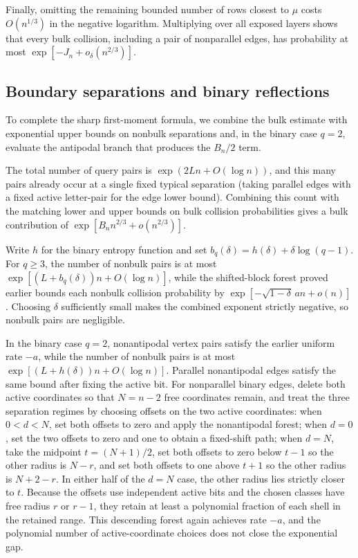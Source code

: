 Finally, omitting the remaining bounded number of rows closest to $\mu$ costs $O(n^{1/3})$ in the negative logarithm. Multiplying over all exposed layers shows that every bulk collision, including a pair of nonparallel edges, has probability at most $\exp[-J_n+o_\delta(n^{2/3})]$.

\subsection{Boundary separations and binary reflections}
To complete the sharp first-moment formula, we combine the bulk estimate with exponential upper bounds on nonbulk separations and, in the binary case $q=2$, evaluate the antipodal branch that produces the $B_n/2$ term.

The total number of query pairs is $\exp(2Ln+O(\log n))$, and this many pairs already occur at a single fixed typical separation (taking parallel edges with a fixed active letter-pair for the edge lower bound). Combining this count with the matching lower and upper bounds on bulk collision probabilities gives a bulk contribution of $\exp[B_n n^{2/3}+o(n^{2/3})]$.

Write $h$ for the binary entropy function and set $b_q(\delta)=h(\delta)+\delta\log(q-1)$. For $q\ge3$, the number of nonbulk pairs is at most $\exp[(L+b_q(\delta))n+O(\log n)]$, while the shifted-block forest proved earlier bounds each nonbulk collision probability by $\exp[-\sqrt{1-\delta}\,an+o(n)]$. Choosing $\delta$ sufficiently small makes the combined exponent strictly negative, so nonbulk pairs are negligible.

In the binary case $q=2$, nonantipodal vertex pairs satisfy the earlier uniform rate $-a$, while the number of nonbulk pairs is at most $\exp[(L+h(\delta))n+O(\log n)]$. Parallel nonantipodal edges satisfy the same bound after fixing the active bit. For nonparallel binary edges, delete both active coordinates so that $N=n-2$ free coordinates remain, and treat the three separation regimes by choosing offsets on the two active coordinates:
when $0<d<N$, set both offsets to zero and apply the nonantipodal forest;
when $d=0$, set the two offsets to zero and one to obtain a fixed-shift path;
when $d=N$, take the midpoint $t=(N+1)/2$, set both offsets to zero below $t-1$ so the other radius is $N-r$, and set both offsets to one above $t+1$ so the other radius is $N+2-r$.
In either half of the $d=N$ case, the other radius lies strictly closer to $t$. Because the offsets use independent active bits and the chosen classes have free radius $r$ or $r-1$, they retain at least a polynomial fraction of each shell in the retained range. This descending forest again achieves rate $-a$, and the polynomial number of active-coordinate choices does not close the exponential gap.

